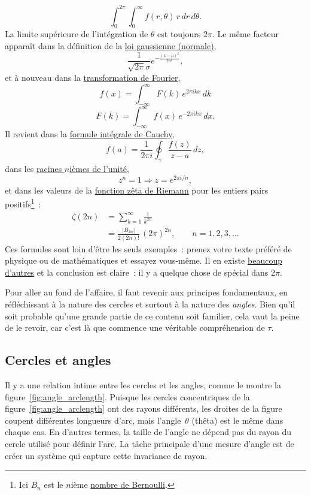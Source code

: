 \[
  \int_0^{2\pi}\int_0^\infty f(r, \theta)\, r\, dr\, d\theta.
\]
La limite supérieure de l'intégration de $\theta$ est toujours $2\pi$. Le même
facteur apparaît dans la définition de la
\href{https://fr.wikipedia.org/wiki/Loi_normale}{loi gaussienne (normale)},
\[
  \frac{1}{\sqrt{2\pi}\sigma}e^{-\frac{(x-\mu)^2}{2\sigma^2}},
\]
et à nouveau dans la
\href{https://fr.wikipedia.org/wiki/Transformation_de_Fourier}{transformation de
Fourier},
\[
  f(x) = \int_{-\infty}^\infty F(k)\, e^{2\pi ikx}\,dk
\]
\[
    F(k) = \int_{-\infty}^\infty f(x)\, e^{-2\pi ikx}\,dx.
\]
Il revient dans la
\href{https://fr.wikipedia.org/wiki/Formule_intégrale_de_Cauchy}{formule
intégrale de Cauchy},
\[
  f(a) = \frac{1}{2\pi i}\oint_\gamma\frac{f(z)}{z-a}\,dz,
\]
dans les \href{https://fr.wikipedia.org/wiki/Racine_de_l%27unité}{racines
$n$ièmes de l'unité},
\[
  z^n = 1 \Rightarrow z = e^{2\pi i/n},
\]
et dans les valeurs de la
\href{https://fr.wikipedia.org/wiki/Fonction_zêta_de_Riemann}{fonction zêta de
Riemann} pour les entiers pairs positifs\ns\footnote{Ici $B_n$ est le $n$ième
\href{https://fr.wikipedia.org/wiki/Nombre_de_Bernoulli}{nombre de
Bernoulli}.}~:
\[
\begin{split}
  \zeta(2n) & = \sum_{k=1}^\infty \frac{1}{k^{2n}} \\
            & = \frac{|B_{2n}|}{2(2n)!}\,(2\pi)^{2n},\qquad n = 1, 2, 3, \ldots
\end{split}
\]
Ces formules sont loin d'être les seuls exemples~: prenez votre texte
préféré de physique ou de mathématiques et essayez vous-même. Il en existe
\href{http://www.harremoes.dk/Peter/Undervis/Turnpage/Turnpage1.html}{beaucoup
d'autres} et la conclusion est claire~: il y a quelque chose de spécial dans
$2\pi$.

Pour aller au fond de l'affaire, il faut revenir aux principes fondamentaux, en
réfléchissant à la nature des cercles et surtout à la nature des \emph{angles}. Bien
qu'il soit probable qu'une grande partie de ce contenu soit familier, cela vaut
la peine de le revoir, car c'est là que commence une véritable compréhension de
$\tau$.

  \subsection{Cercles et angles} %
  \label{sec:circles_and_angles}

Il y a une relation intime entre les cercles et les angles, comme le montre la
figure~\ref{fig:angle_arclength}. Puisque les cercles concentriques de la
figure~\ref{fig:angle_arclength} ont des rayons différents, les droites de la
figure coupent différentes longueurs d'arc, mais l'angle~$\theta$ (thêta) est le
même dans chaque cas. En d'autres termes, la taille de l'angle ne dépend pas du
rayon du cercle utilisé pour définir l'arc. La tâche principale d'une mesure
d'angle est de créer un système qui capture cette invariance de rayon.

